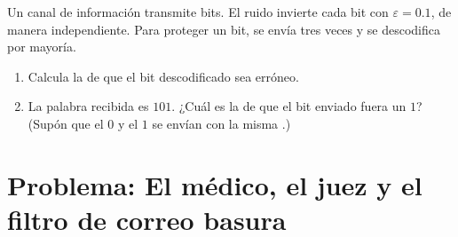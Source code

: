 \begin{exercise}[$\star\star\star$]\label{exo:g12:condprob:8}
Un canal de información transmite bits. El ruido invierte cada bit con
 $\varepsilon = 0.1$, de manera independiente. Para proteger un
bit, se envía tres veces y se descodifica por mayoría.
\begin{enumerate}
  \item Calcula la  de que el bit descodificado sea erróneo.
  \item La palabra recibida es $101$. ¿Cuál es la  de que el
        bit enviado fuera un $1$? (Supón que el $0$ y el $1$ se envían con
        la misma .)
\end{enumerate}
\end{exercise}

\section{Problema: El médico, el juez y el filtro de correo basura}

